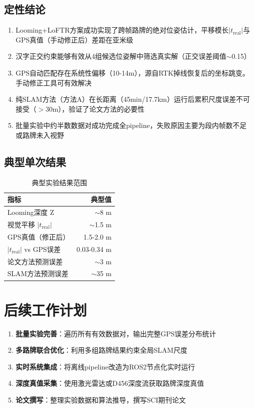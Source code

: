 \documentclass[12pt,a4paper]{ctexart}
\begin{document}
\subsection{定性结论}

\begin{enumerate}
    \item Looming+LoFTR方案成功实现了跨帧路牌的绝对位姿估计，平移模长$|t_{\text{real}}|$与GPS真值（手动修正后）差距在亚米级
    \item 汉字正交约束能够有效从4组候选位姿解中筛选真实解（正交误差阈值$\sim$0.15）
    \item GPS自动匹配存在系统性偏移（10-14m），源自RTK掉线恢复后的坐标跳变。手动修正工具可有效解决
    \item 纯SLAM方法（方法A）在长距离（45min/17.7km）运行后累积尺度误差不可接受（$>$30m），验证了论文方法的必要性
    \item 批量实验中约半数数据对成功完成全pipeline，失败原因主要为段内帧数不足或路牌未入视野
\end{enumerate}

\subsection{典型单次结果}

\begin{table}[h]\centering
\begin{tabular}{lr}\toprule
指标 & 典型值 \\\midrule
Looming深度 Z & $\sim$8 m \\
视觉平移 $|t_{\text{real}}|$ & $\sim$1.5 m \\
GPS真值（修正后） & 1.5-2.0 m \\
$|t_{\text{real}}|$ vs GPS误差 & 0.03-0.34 m \\
论文方法预测误差 & $\sim$3 m \\
SLAM方法预测误差 & $\sim$35 m \\\bottomrule
\end{tabular}
\caption{典型实验结果范围}
\end{table}

\section{后续工作计划}

\begin{enumerate}
    \item \textbf{批量实验完善}：遍历所有有效数据对，输出完整GPS误差分布统计
    \item \textbf{多路牌联合优化}：利用多组路牌结果约束全局SLAM尺度
    \item \textbf{实时系统集成}：将离线pipeline改造为ROS2节点化实时运行
    \item \textbf{深度真值采集}：使用激光雷达或D456深度流获取路牌深度真值
    \item \textbf{论文撰写}：整理实验数据和算法推导，撰写SCI期刊论文
\end{enumerate}
\end{document}
